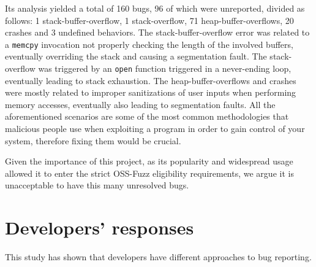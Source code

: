 Its analysis yielded a total of 160 bugs, 96 of which were unreported, divided as follows: 1 stack-buffer-overflow, 1 stack-overflow, 71 heap-buffer-overflows, 20 crashes and 3 undefined behaviors. The stack-buffer-overflow error was related to a \verb|memcpy| invocation not properly checking the length of the involved buffers, eventually overriding the stack and causing a segmentation fault. The stack-overflow was triggered by an \verb|open| function triggered in a never-ending loop, eventually leading to stack exhaustion. The heap-buffer-overflows and crashes were mostly related to improper sanitizations of user inputs when performing memory accesses, eventually also leading to segmentation faults. All the aforementioned scenarios are some of the most common methodologies that malicious people use when exploiting a program in order to gain control of your system, therefore fixing them would be crucial.


Given the importance of this project, as its popularity and widespread usage allowed it to enter the strict OSS-Fuzz eligibility requirements, we argue it is unacceptable to have this many unresolved bugs.







\newpage
\section{Developers' responses}
This study has shown that developers have different approaches to bug reporting. 

